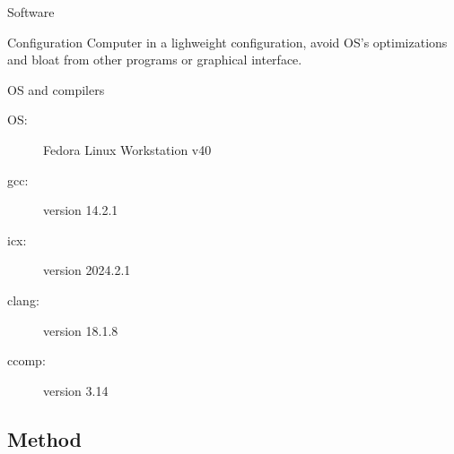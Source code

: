 \documentclass{beamer}
\begin{document}
    
    
    \begin{frame}{Software}
        \begin{block}{Configuration}
            Computer in a lighweight configuration, avoid OS's optimizations and bloat from other programs or graphical interface.
        \end{block}
        \begin{block}{OS and compilers}
            \begin{description}
                \item[OS: ] Fedora Linux Workstation v40
                \item[gcc: ] version 14.2.1
                \item[icx: ] version 2024.2.1
                \item[clang: ] version 18.1.8
                \item[ccomp: ] version 3.14
            \end{description}
        \end{block}
    \end{frame}
    
    \subsection{Method}
    
\end{document}
